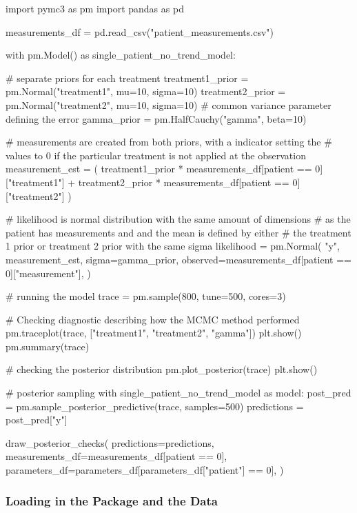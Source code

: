 \documentclass[12pt,a4paper,leqno]{report}
\theoremstyle{plain}
\theoremstyle{definition}
\theoremstyle{remark}
\begin{document}
\begin{pyverbatim}
import pymc3 as pm
import pandas as pd

measurements_df = pd.read_csv("patient_measurements.csv")
   
with pm.Model() as single_patient_no_trend_model:

    # separate priors for each treatment
    treatment1_prior = pm.Normal("treatment1", mu=10, sigma=10)
    treatment2_prior = pm.Normal("treatment2", mu=10, sigma=10)
    # common variance parameter defining the error
    gamma_prior = pm.HalfCauchy("gamma", beta=10)

    # measurements are created from both priors, with a indicator setting the
    # values to 0 if the particular treatment is not applied at the observation
    measurement_est = (
        treatment1_prior
        * measurements_df[patient == 0]["treatment1"]
        + treatment2_prior
        * measurements_df[patient == 0]["treatment2"]
    )

    # likelihood is normal distribution with the same amount of dimensions
    # as the patient has measurements and and the mean is defined by either
    # the treatment 1 prior or treatment 2 prior with the same sigma
    likelihood = pm.Normal(
        "y",
        measurement_est,
        sigma=gamma_prior,
        observed=measurements_df[patient == 0]["measurement"],
    )

    # running the model
    trace = pm.sample(800, tune=500, cores=3)

    # Checking diagnostic describing how the MCMC method performed
    pm.traceplot(trace, ["treatment1", "treatment2", "gamma"])
    plt.show()
    pm.summary(trace)

    # checking the posterior distribution
    pm.plot_posterior(trace)
    plt.show()

 
# posterior sampling
with single_patient_no_trend_model as model:
    post_pred = pm.sample_posterior_predictive(trace, samples=500)
    predictions = post_pred["y"]

draw_posterior_checks(
    predictions=predictions,
    measurements_df=measurements_df[patient == 0],
    parameters_df=parameters_df[parameters_df["patient"] == 0],
)
\end{pyverbatim}

\subsubsection{Loading in the Package and the Data}
\end{document}

